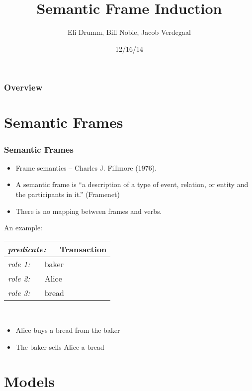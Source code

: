 \documentclass{beamer}
\title[Semantic Frame Induction]{Semantic Frame Induction} %
\author{Eli Drumm, Bill Noble, Jacob Verdegaal} %
\institute[UvA] %
{
University of Amsterdam \\ %
\medskip

}
\date{12/16/14}
\begin{document}
\begin{frame}
\titlepage 
\end{frame}

\begin{frame}
\frametitle{Overview} 
\tableofcontents 
\end{frame}


\section{Semantic Frames}


\begin{frame}
  \frametitle{Semantic Frames}
  \begin{itemize}
  \item Frame semantics -- Charles J. Fillmore (1976).
  \item A semantic frame is ``a description of a type of event, relation, 
  or entity and the participants in it.'' (Framenet)
  \item There is no mapping between frames and verbs.
  \end{itemize}
  An example:\\
  \vspace{10pt}
\begin{tabular}{|l|}
  \hline
  \textit{\small predicate:\normalsize}~~~Transaction\\
  \hline
  \hline
  \textit{\small role 1:\normalsize}~~~ baker\\
  \textit{\small role 2:\normalsize}~~~ Alice\\
  \textit{\small role 3:\normalsize}~~~ bread\\
  \hline
\end{tabular}\\
\vfill
\begin{itemize}
\item Alice buys a bread from the baker
\item The baker sells Alice a bread
  \end{itemize}
\end{frame}

\section{Models}
\end{document}
